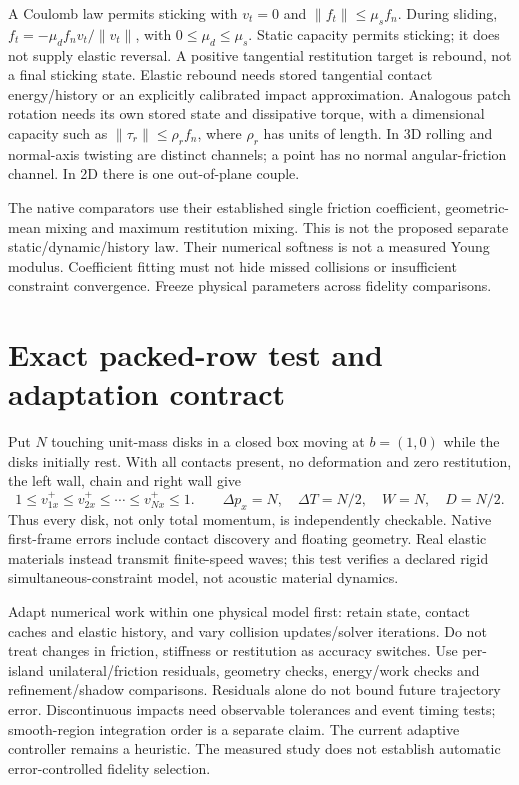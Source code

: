 \documentclass[11pt]{article}
\begin{document}
A Coulomb law permits sticking with $v_t=0$ and
$\lVert f_t\rVert\leq\mu_s f_n$. During sliding,
$f_t=-\mu_d f_n v_t/\lVert v_t\rVert$, with $0\leq\mu_d\leq\mu_s$.
Static capacity permits sticking; it does not supply elastic reversal.
A positive tangential restitution target is rebound, not a final sticking state.
Elastic rebound needs stored tangential contact energy/history or an explicitly
calibrated impact approximation. Analogous patch rotation needs its own stored
state and dissipative torque, with a dimensional capacity such as
$\lVert\tau_r\rVert\leq\rho_r f_n$, where $\rho_r$ has units of length.
In 3D rolling and normal-axis twisting are distinct channels; a point has no
normal angular-friction channel. In 2D there is one out-of-plane couple.

The native comparators use their established single friction coefficient,
geometric-mean mixing and maximum restitution mixing. This is not the proposed
separate static/dynamic/history law. Their numerical softness is not a measured
Young modulus. Coefficient fitting must not hide missed collisions or insufficient
constraint convergence. Freeze physical parameters across fidelity comparisons.

\section{Exact packed-row test and adaptation contract}
Put $N$ touching unit-mass disks in a closed box moving at $b=(1,0)$ while
the disks initially rest. With all contacts present, no deformation and zero
restitution, the left wall, chain and right wall give
\begin{equation}
 1\leq v_{1x}^+\leq v_{2x}^+\leq\cdots\leq v_{Nx}^+\leq1.
 \qquad \Delta p_x=N,\quad \Delta T=N/2,\quad W=N,\quad D=N/2.
\end{equation}
Thus every disk, not only total momentum, is independently checkable. Native
first-frame errors include contact discovery and floating geometry. Real elastic
materials instead transmit finite-speed waves; this test verifies a declared
rigid simultaneous-constraint model, not acoustic material dynamics.

Adapt numerical work within one physical model first: retain state, contact
caches and elastic history, and vary collision updates/solver iterations.
Do not treat changes in friction, stiffness or restitution as accuracy switches.
Use per-island unilateral/friction residuals, geometry checks, energy/work
checks and refinement/shadow comparisons. Residuals alone do not bound future
trajectory error. Discontinuous impacts need observable tolerances and event
timing tests; smooth-region integration order is a separate claim.
The current adaptive controller remains a heuristic. The measured study does
not establish automatic error-controlled fidelity selection.
\end{document}
